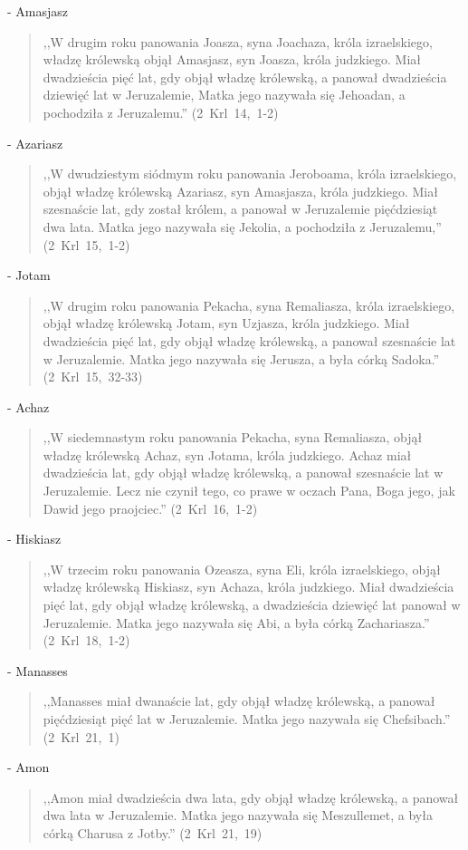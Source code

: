 \documentclass[10pt,a4paper,oneside]{article}
\begin{document}
- Amasjasz
\begin{quote}
,,W drugim roku panowania Joasza, syna Joachaza, króla izraelskiego, władzę królewską objął Amasjasz, syn Joasza, króla judzkiego. Miał dwadzieścia pięć lat, gdy objął władzę królewską, a panował dwadzieścia dziewięć lat w Jeruzalemie, Matka jego nazywała się Jehoadan, a pochodziła z Jeruzalemu.'' (2~Krl~14,~1-2)
\end{quote}
- Azariasz
\begin{quote}
,,W dwudziestym siódmym roku panowania Jeroboama, króla izraelskiego, objął władzę królewską Azariasz, syn Amasjasza, króla judzkiego. Miał szesnaście lat, gdy został królem, a panował w Jeruzalemie pięćdziesiąt dwa lata. Matka jego nazywała się Jekolia, a pochodziła z Jeruzalemu,'' (2~Krl~15,~1-2)
\end{quote}
- Jotam
\begin{quote}
,,W drugim roku panowania Pekacha, syna Remaliasza, króla izraelskiego, objął władzę królewską Jotam, syn Uzjasza, króla judzkiego. Miał dwadzieścia pięć lat, gdy objął władzę królewską, a panował szesnaście lat w Jeruzalemie. Matka jego nazywała się Jerusza, a była córką Sadoka.'' (2~Krl~15,~32-33)
\end{quote}
- Achaz
\begin{quote}
,,W siedemnastym roku panowania Pekacha, syna Remaliasza, objął władzę królewską Achaz, syn Jotama, króla judzkiego. Achaz miał dwadzieścia lat, gdy objął władzę królewską, a panował szesnaście lat w Jeruzalemie. Lecz nie czynił tego, co prawe w oczach Pana, Boga jego, jak Dawid jego praojciec.'' (2~Krl~16,~1-2)
\end{quote}
- Hiskiasz
\begin{quote}
,,W trzecim roku panowania Ozeasza, syna Eli, króla izraelskiego, objął władzę królewską Hiskiasz, syn Achaza, króla judzkiego. Miał dwadzieścia pięć lat, gdy objął władzę królewską, a dwadzieścia dziewięć lat panował w Jeruzalemie. Matka jego nazywała się Abi, a była córką Zachariasza.'' (2~Krl~18,~1-2)
\end{quote}
- Manasses
\begin{quote}
,,Manasses miał dwanaście lat, gdy objął władzę królewską, a panował pięćdziesiąt pięć lat w Jeruzalemie. Matka jego nazywała się Chefsibach.'' (2~Krl~21,~1)
\end{quote}
- Amon
\begin{quote}
,,Amon miał dwadzieścia dwa lata, gdy objął władzę królewską, a panował dwa lata w Jeruzalemie. Matka jego nazywała się Meszullemet, a była córką Charusa z Jotby.'' (2~Krl~21,~19)
\end{quote}
\end{document}
